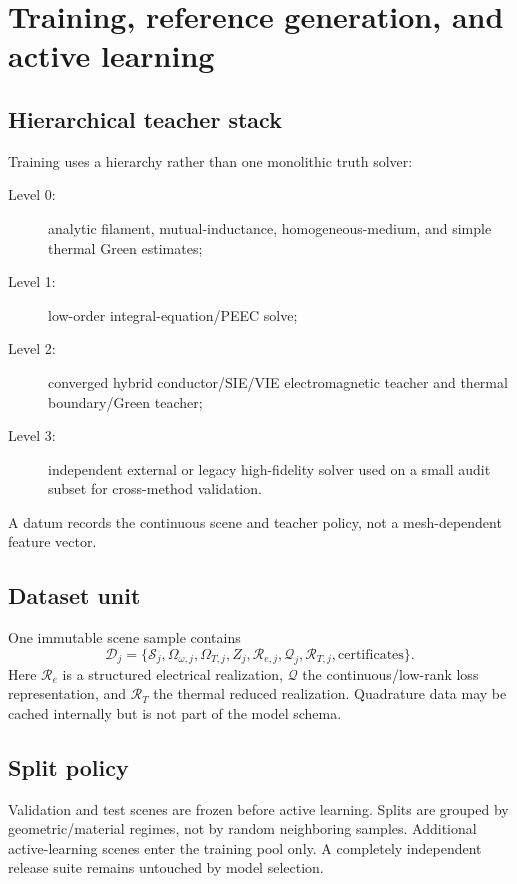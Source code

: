 \section{Training, reference generation, and active learning}

\subsection{Hierarchical teacher stack}

Training uses a hierarchy rather than one monolithic truth solver:
\begin{description}
\item[Level 0:] analytic filament, mutual-inductance, homogeneous-medium, and
  simple thermal Green estimates;
\item[Level 1:] low-order integral-equation/PEEC solve;
\item[Level 2:] converged hybrid conductor/SIE/VIE electromagnetic teacher and
  thermal boundary/Green teacher;
\item[Level 3:] independent external or legacy high-fidelity solver used on a
  small audit subset for cross-method validation.
\end{description}

A datum records the continuous scene and teacher policy, not a mesh-dependent
feature vector.

\subsection{Dataset unit}

One immutable scene sample contains
\[
 \mathcal D_j=
 \{\mathcal S_j,\Omega_{\omega,j},\Omega_{T,j},
 Z_j,\mathcal R_{e,j},\mathcal Q_j,\mathcal R_{T,j},
 \text{certificates}\}.
\]
Here $\mathcal R_e$ is a structured electrical realization, $\mathcal Q$ the
continuous/low-rank loss representation, and $\mathcal R_T$ the thermal reduced
realization. Quadrature data may be cached internally but is not part of the
model schema.

\subsection{Split policy}

Validation and test scenes are frozen before active learning. Splits are grouped
by geometric/material regimes, not by random neighboring samples. Additional
active-learning scenes enter the training pool only. A completely independent
release suite remains untouched by model selection.

